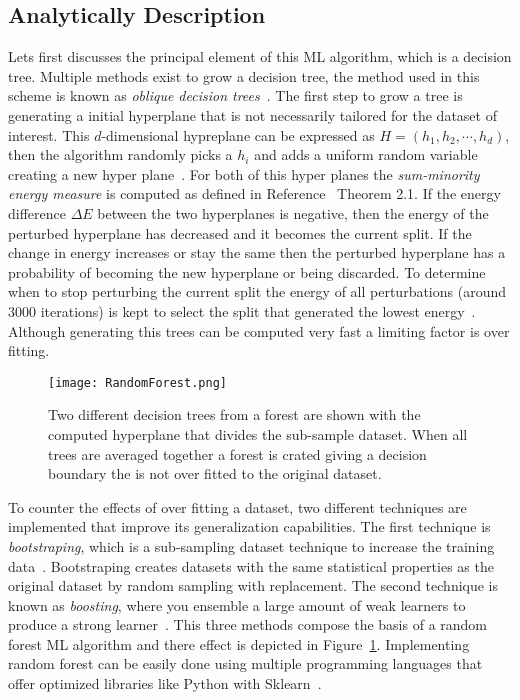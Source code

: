    
\subsection{Analytically Description}

 Lets first discusses the principal element of this ML algorithm, which is a decision tree. Multiple methods exist to grow a decision tree, the method used in this scheme is known as  \textit{oblique decision trees}~\cite{ho1995random}.  The first step to grow a tree is generating a initial hyperplane that is not necessarily tailored for the dataset of interest. This $d$-dimensional hypreplane can be expressed as $H=(h_{1},h_{2},\cdots,h_{d})$, then the algorithm randomly picks a $h_{i}$ and adds a uniform random variable creating a new hyper plane~\cite{heath1993induction}. For both of this hyper planes the \textit{sum-minority energy measure} is computed as defined in Reference~\cite{heath1993induction} Theorem 2.1. If the energy difference $\Delta E$ between the two hyperplanes is negative, then the energy of the perturbed hyperplane has decreased and it becomes the current split. If the change in energy increases or stay the same then the perturbed hyperplane has a probability of becoming the new hyperplane or being discarded. To determine when to stop perturbing the current split the energy of all perturbations (around 3000 iterations) is kept to select the split that generated the lowest energy~\cite{heath1993induction}. Although generating this trees can be computed very fast a limiting factor is over fitting.~\\

\begin{figure}[h]
\centering
\texttt{[image: RandomForest.png]}
\caption{ Two different decision trees from a forest are shown  with the computed hyperplane that divides the sub-sample dataset. When all trees are averaged together a forest is crated giving a decision boundary the is not over fitted to the original dataset. }
\label{fig:RFshow}
\end{figure}

To counter the effects of over fitting a dataset, two different techniques are implemented that improve its generalization capabilities. The first technique is\textit{ bootstraping}, which is a sub-sampling dataset technique to increase the training data~\cite{friedman2002stochastic}. Bootstraping creates datasets with the same statistical properties as the original dataset by random sampling with replacement. The second technique is known as \textit{boosting}, where you ensemble a large amount of weak learners to produce a strong learner~\cite{hancock2012bootstrapping}. This three methods compose the basis of a random forest ML algorithm and there effect is depicted in Figure~\ref{fig:RFshow}. Implementing random forest can be easily done using multiple programming languages that offer optimized libraries like Python with Sklearn~\cite{scikit-learn}.

